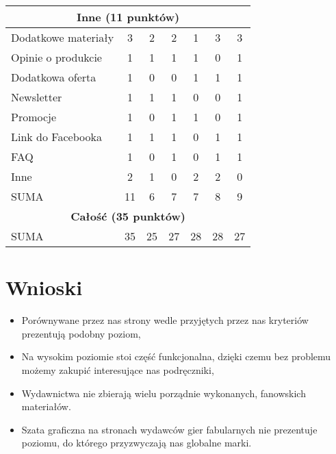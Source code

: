 \documentclass[a4paper,11pt]{article}
\begin{document}
\begin{tabular}{|l|c||c|c|c|c|c|}
	\multicolumn{7}{|c|}{\textbf{Inne (11 punktów)}} \\
	\hline
	Dodatkowe materiały & 3 & 2 & 2 & 1 & 3 & 3 \\ 
	\hline
	Opinie o produkcie & 1 & 1 & 1 & 1 & 0 & 1 \\ 
	\hline
	Dodatkowa oferta & 1 & 0 & 0 & 1 & 1 & 1 \\ 
	\hline
	Newsletter & 1 & 1 & 1 & 0 & 0 & 1 \\ 
	\hline
	Promocje & 1 & 0 & 1 & 1 & 0 & 1 \\ 
	\hline
	Link do Facebooka & 1 & 1 & 1 & 0 & 1 & 1 \\ 
	\hline
	FAQ & 1 & 0 & 1 & 0 & 1 & 1 \\ 
	\hline
	Inne & 2 & 1 & 0 & 2 & 2 & 0 \\ 
	\hline \hline
	SUMA & 11 & 6 & 7 & 7 & 8 & 9 \\ 
	\hline \hline
	
	\multicolumn{7}{|c|}{\textbf{Całość (35 punktów)}} \\
	\hline
	SUMA & 35 & 25 & 27 & 28 & 28 & 27 \\ 
	\hline
	
\end{tabular}

\newpage

\section {Wnioski}
\begin{itemize}
	\item Porównywane przez nas strony wedle przyjętych przez nas kryteriów prezentują podobny poziom,
	\item Na wysokim poziomie stoi część funkcjonalna, dzięki czemu bez problemu możemy zakupić interesujące nas podręczniki,
	\item Wydawnictwa nie zbierają wielu porządnie wykonanych, fanowskich materiałów.
	\item Szata graficzna na stronach wydawców gier fabularnych nie prezentuje poziomu, do którego przyzwyczają nas globalne marki.
\end{itemize} 
\end{document}
